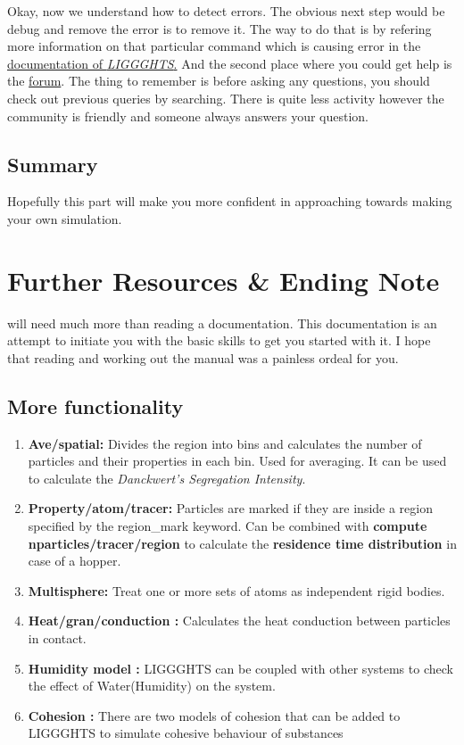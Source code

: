 \documentclass{tufte-book} %
\newcommand{\Li}{\textit{LIGGGHTS}\xspace}
\begin{document}
Okay, now we understand how to detect errors. The obvious next step would be debug and remove the error is to remove it. The way to do that is by refering more information on that particular command which is causing error in the \href{http://www.cfdem.com/media/DEM/docu/Section_commands.html#comm}{documentation of \Li.}
And the second place where you could get help is the \href{http://www.cfdem.com/forum}{forum}. The thing to remember is before asking any questions, you should check out previous queries by searching. There is quite less activity however the community is friendly and someone always answers your question.
\section{Summary}

Hopefully this part will make you more confident in approaching towards making your own simulation.

\chapter{Further Resources \& Ending Note}
\label{chap:4}

\begin{fullwidth}
  \newthought{Learning to work with \Li} will need much more than reading a documentation. This documentation is an attempt to initiate you with the basic skills to get you started with it. I hope that reading and working out the manual was a painless ordeal for you.  
\end{fullwidth}

\section{More functionality}
\begin{enumerate}
\item \textbf{Ave/spatial:} Divides the region into bins and calculates the number of particles and their properties in each bin. Used for averaging. It can be used to calculate the \textit{Danckwert's Segregation Intensity}.
\item \textbf{Property/atom/tracer: } Particles are marked if they are inside a region specified by the region\_mark keyword. Can be combined with \textbf{compute nparticles/tracer/region} to calculate the \textbf{residence time distribution} in case of a hopper.
\item \textbf{Multisphere: } Treat one or more sets of atoms as independent rigid bodies.
\item \textbf{Heat/gran/conduction :} Calculates the heat conduction between particles in contact.
\item \textbf{Humidity model :} LIGGGHTS can be coupled with other systems to check the effect of Water(Humidity) on the system.
\item \textbf{Cohesion : } There are two models of cohesion that can be added to LIGGGHTS to simulate cohesive behaviour of substances
\end{enumerate}
\end{document}
